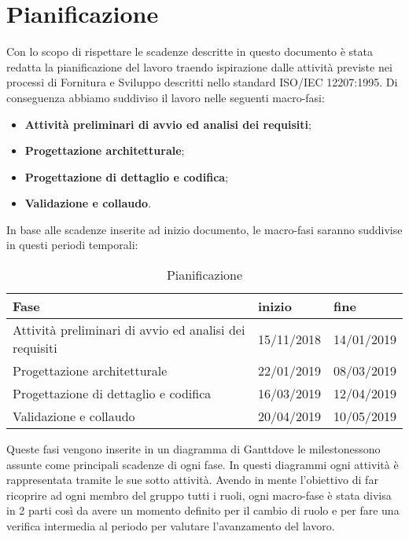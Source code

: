 \section{Pianificazione}

Con lo scopo di rispettare le scadenze descritte in questo documento è stata redatta la pianificazione del lavoro traendo ispirazione dalle attività previste nei processi di Fornitura e Sviluppo descritti nello standard ISO/IEC 12207:1995. Di conseguenza abbiamo suddiviso il lavoro nelle seguenti macro-fasi:
\begin{itemize}
	\item{\textbf{Attività preliminari di avvio ed analisi dei requisiti}};
	\item{\textbf{Progettazione architetturale}};
	\item{\textbf{Progettazione di dettaglio e codifica}};
	\item{\textbf{Validazione e collaudo}}.
\end{itemize} 
In base alle scadenze inserite ad inizio documento, le macro-fasi saranno suddivise in questi periodi temporali:
\newline
\begin{table}[!htpb]
	\centering
	\renewcommand{\arraystretch}{2} 
	\begin{tabular}{|l|l|l|}
		\hline
		\rowcolor{orange!50}
		\textbf{Fase} & \textbf{inizio} & \textbf{fine}\\
		\hline
		Attività preliminari di avvio ed analisi dei requisiti & 15/11/2018 & 14/01/2019 \\
		\hline
		Progettazione architetturale & 22/01/2019 & 08/03/2019\\
		\hline
		Progettazione di dettaglio e codifica & 16/03/2019 & 12/04/2019\\
		\hline
		Validazione e collaudo & 20/04/2019 & 10/05/2019\\
		\hline
	\end{tabular}
	\caption{Pianificazione}
\end{table}
\newline Queste fasi vengono inserite in un diagramma di Gantt\pedice dove le milestones\pedice sono assunte come principali scadenze di ogni fase. In questi diagrammi ogni attività è rappresentata tramite le sue sotto attività.
\newline Avendo in mente l'obiettivo di far ricoprire ad ogni membro del gruppo tutti i ruoli, ogni macro-fase è stata divisa in 2 parti così da avere un momento definito per il cambio di ruolo e per fare una verifica intermedia al periodo per valutare l'avanzamento del lavoro. 


\clearpage

\clearpage

\clearpage

\clearpage
